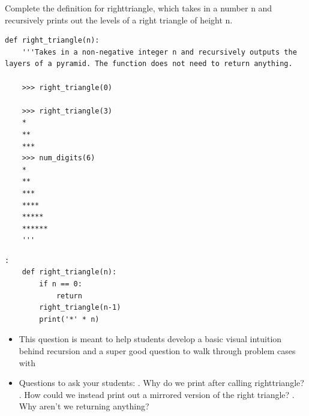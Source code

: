 \begin{blocksection}
\question Complete the definition for righttriangle, which takes in a number n and recursively prints out the levels of a right triangle of height n. 

\begin{lstlisting}
def right_triangle(n):
    '''Takes in a non-negative integer n and recursively outputs the layers of a pyramid. The function does not need to return anything. 

    >>> right_triangle(0)
    
    >>> right_triangle(3)
    *
    **
    ***
    >>> num_digits(6)
    *
    ** 
    ***
    **** 
    ***** 
    ****** 
    '''
\end{lstlisting}

\begin{solution}[1in]
\begin{lstlisting}:
    def right_triangle(n):
        if n == 0:
            return
        right_triangle(n-1)
        print('*' * n)
\end{lstlisting}
\end{solution}
\end{blocksection}


\begin{questionmeta}
    \begin{itemize}
        \item This question is meant to help students develop a basic visual intuition behind recursion and a super good question to walk through problem cases with
        \item Questions to ask your students:
        . Why do we print after calling righttriangle?
        . How could we instead print out a mirrored version of the right triangle? 
        . Why aren't we returning anything? 
    \end{itemize}
\end{questionmeta}

